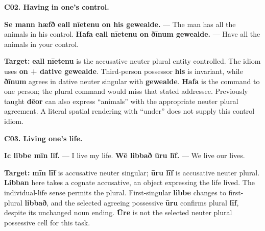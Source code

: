\par\begin{minipage}{\linewidth}\raggedright
\textbf{C02. Having in one's control.}

\textbf{Se mann hæfð eall nīetenu on his gewealde.} — The man has all the animals in his control. \textbf{Hafa eall nīetenu on ðīnum gewealde.} — Have all the animals in your control.

\textbf{Target:} \textbf{eall nīetenu} is the accusative neuter plural entity controlled. The idiom uses \textbf{on + dative gewealde}. Third-person possessor \textbf{his} is invariant, while \textbf{ðīnum} agrees in dative neuter singular with \textbf{gewealde}. \textbf{Hafa} is the command to one person; the plural command would miss that stated addressee. Previously taught \textbf{dēor} can also express “animals” with the appropriate neuter plural agreement. A literal spatial rendering with “under” does not supply this control idiom.

\end{minipage}\par\addvspace{4pt}

\par\begin{minipage}{\linewidth}\raggedright
\textbf{C03. Living one's life.}

\textbf{Ic libbe mīn līf.} — I live my life. \textbf{Wē libbað ūru līf.} — We live our lives.

\textbf{Target:} \textbf{mīn līf} is accusative neuter singular; \textbf{ūru līf} is accusative neuter plural. \textbf{Libban} here takes a cognate accusative, an object expressing the life lived. The individual-life sense permits the plural. First-singular \textbf{libbe} changes to first-plural \textbf{libbað}, and the selected agreeing possessive \textbf{ūru} confirms plural \textbf{līf}, despite its unchanged noun ending. \textbf{Ūre} is not the selected neuter plural possessive cell for this task.

\end{minipage}\par\addvspace{4pt}

